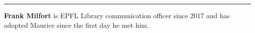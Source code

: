 \begin{center}\rule{0.5\linewidth}{0.5pt}\end{center}

\textbf{Frank Milfort} is EPFL Library communication officer since
2017 and has adopted Maurice since the first day he met him.
